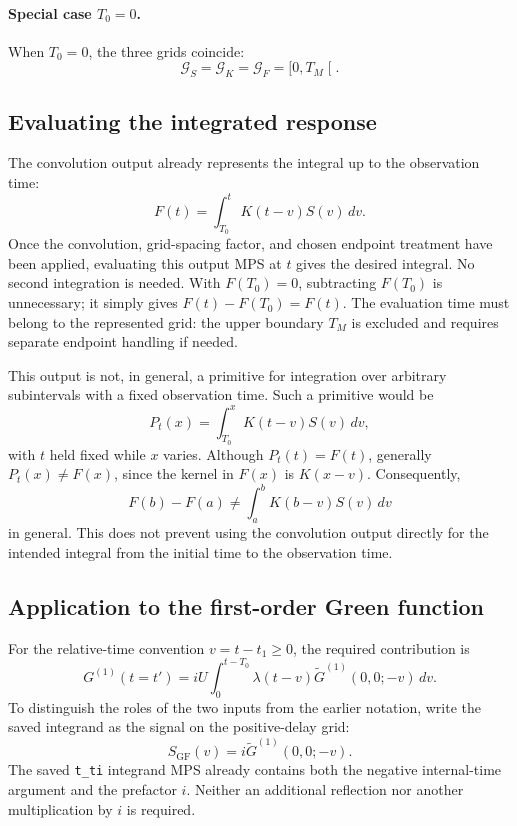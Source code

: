 \documentclass{article}
\begin{document}
\paragraph{Special case $T_0=0$.}

When $T_0=0$, the three grids coincide:
\begin{equation}
    \boxed{
    \mathcal{G}_S=\mathcal{G}_K=\mathcal{G}_F
    =\lbrack 0,T_M\mathclose{\lbrack}.
    }
\end{equation}

\subsection{Evaluating the integrated response}

The convolution output already represents the integral up to the observation
time:
\begin{equation}
    F(t)=\int_{T_0}^{t}K(t-v)S(v)\,dv.
\end{equation}
Once the convolution, grid-spacing factor, and chosen endpoint treatment
have been applied, evaluating this output MPS at $t$ gives the desired
integral. No second integration is needed. With $F(T_0)=0$, subtracting
$F(T_0)$ is unnecessary; it simply gives $F(t)-F(T_0)=F(t)$.
The evaluation time must belong to the represented grid: the upper boundary
$T_M$ is excluded and requires separate endpoint handling if needed.

This output is not, in general, a primitive for integration over arbitrary
subintervals with a fixed observation time. Such a primitive would be
\begin{equation}
    P_t(x)=\int_{T_0}^{x}K(t-v)S(v)\,dv,
\end{equation}
with $t$ held fixed while $x$ varies. Although $P_t(t)=F(t)$, generally
$P_t(x)\neq F(x)$, since the kernel in $F(x)$ is $K(x-v)$.
Consequently,
\begin{equation}
    F(b)-F(a)\neq\int_a^b K(b-v)S(v)\,dv
\end{equation}
in general. This does not prevent using the convolution output directly
for the intended integral from the initial time to the observation time.

\subsection{Application to the first-order Green function}

For the relative-time convention $v=t-t_1\geq0$, the required contribution is
\begin{equation}
    G^{(1)}(t=t')=
    iU\int_0^{t-T_0}\lambda(t-v)
    \widetilde G^{(1)}(0,0;-v)\,dv.
\end{equation}
To distinguish the roles of the two inputs from the earlier notation,
write the saved integrand as the signal on the positive-delay grid:
\begin{equation}
    S_{\mathrm{GF}}(v)=i\widetilde G^{(1)}(0,0;-v).
\end{equation}
The saved \texttt{t\_ti} integrand MPS already contains both the negative
internal-time argument and the prefactor $i$. Neither an additional
reflection nor another multiplication by $i$ is required.
\end{document}
